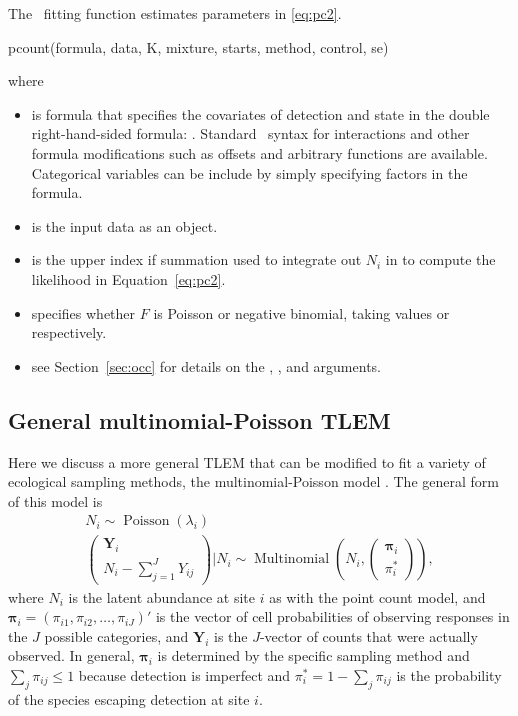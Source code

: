 \documentclass[article,shortnames]{jss}
\DeclareMathOperator{\Poi}{Poisson}
\DeclareMathOperator{\MN}{Multinomial}
\newcommand{\um}{\pkg{unmarked}}
\newcommand{\rlang}{\proglang{R}}
\begin{document}
The \um\ fitting function  estimates parameters in 
\eqref{eq:pc2}.

\begin{Code}
pcount(formula, data, K, mixture, starts, method, control, se)
\end{Code}
where 
\begin{itemize}
\item {} is formula that specifies the covariates of
  detection and state in the double right-hand-sided formula: .  Standard \rlang\ syntax for
  interactions and other formula modifications such as offsets and
  arbitrary functions are available.  Categorical variables can be
  include by simply specifying factors in the formula.
\item {} is the input data as an
   object.
\item {} is the upper index if summation used to integrate out
  $N_{i}$ in to compute the likelihood in Equation~\eqref{eq:pc2}.
\item {} specifies whether $F$ is Poisson or negative
  binomial, taking values  or  respectively.
\item see Section~\ref{sec:occ} for details on the ,
  , and  arguments.
\end{itemize}

     
\subsection{General multinomial-Poisson TLEM}
\label{sec:gener-mult-poiss}
Here we discuss a more general TLEM that can be modified to fit a
variety of ecological sampling methods, the multinomial-Poisson model
\citep{Royle2004a}.  The general form of this model is
\begin{gather}
  N_i \sim \Poi(\lambda_i) \label{eq:mp2} \\
  \begin{pmatrix}
    \mathbf Y_i\\
    N_{i} - \sum_{j=1}^{J} Y_{ij}
  \end{pmatrix}
  \bigg| N_{i} \sim \MN\left(N_i, 
  \begin{pmatrix}
    \boldsymbol \pi_i \\
    \pi_{i}^{*}
  \end{pmatrix}\right),
\end{gather}
where $N_i$ is the latent abundance at site $i$ as with the point
count model, and $\boldsymbol \pi_i=(\pi_{i1},\pi_{i2},\dots,\pi_{iJ})'$ is
the vector of cell probabilities of observing responses in the $J$
possible categories, and $\mathbf Y_{i}$ is the $J$-vector of counts
that were actually observed.  In general, $\boldsymbol \pi_i$ is
determined by the specific sampling method and
$\sum_{j} \pi_{ij} \le 1$ because detection is imperfect and
$\pi_{i}^{*}=1 - \sum_{j} \pi_{ij}$ is the probability of the species
escaping detection at site $i$.  
\end{document}
